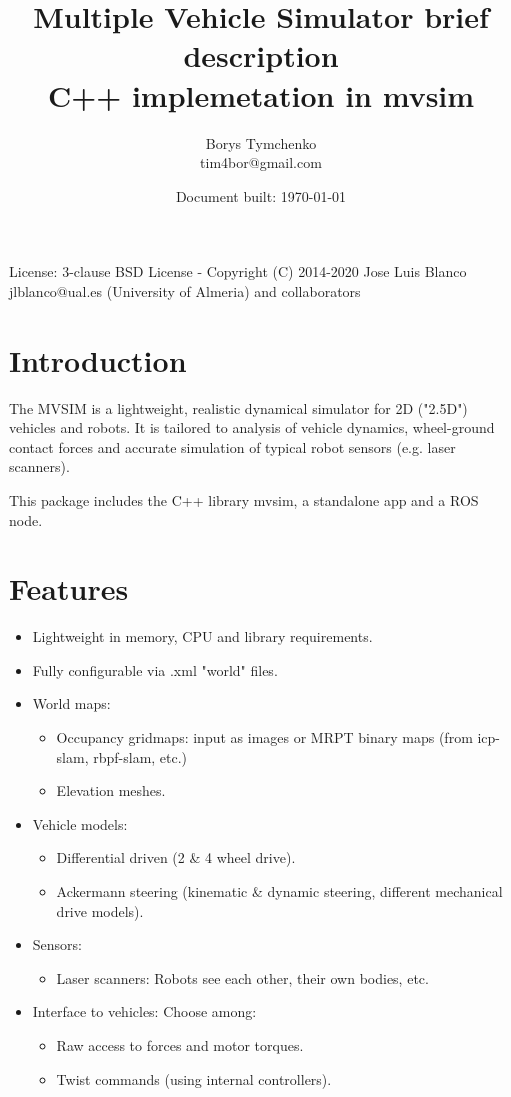 \documentclass[a4paper,11pt]{article}
\title{Multiple Vehicle Simulator brief description \\ C++ implemetation in mvsim}
\author{Borys Tymchenko \\ tim4bor@gmail.com}
\date{Document built: \today}
\begin{document}
\maketitle
\vfill
\begin{center}
License: 3-clause BSD License - Copyright (C) 2014-2020 Jose Luis Blanco jlblanco@ual.es (University of Almeria) and collaborators
\end{center}

\newpage
\tableofcontents
\newpage

\section{Introduction}

The MVSIM is a lightweight, realistic dynamical simulator for 2D ("2.5D") vehicles and robots. It is tailored to analysis of vehicle dynamics, wheel-ground contact forces and accurate simulation of typical robot sensors (e.g. laser scanners).

This package includes the C++ library mvsim, a standalone app and a ROS node.

\newpage

\section{Features}
\begin{itemize}

\item Lightweight in memory, CPU and library requirements.
\item Fully configurable via .xml "world" files.
\item World maps:
	\begin{itemize}
		\item Occupancy gridmaps: input as images or MRPT binary maps (from icp-slam, rbpf-slam, etc.)
		\item Elevation meshes.
	\end{itemize}
\item Vehicle models:
	\begin{itemize}
		\item Differential driven (2 \& 4 wheel drive).
		\item Ackermann steering (kinematic \& dynamic steering, different mechanical drive models).
	\end{itemize}
\item Sensors:
	\begin{itemize}
		\item Laser scanners: Robots see each other, their own bodies, etc.
	\end{itemize}
\item Interface to vehicles: Choose among:
	\begin{itemize}
		\item Raw access to forces and motor torques.
		\item Twist commands (using internal controllers).
	\end{itemize}

\end{itemize}
\end{document}
